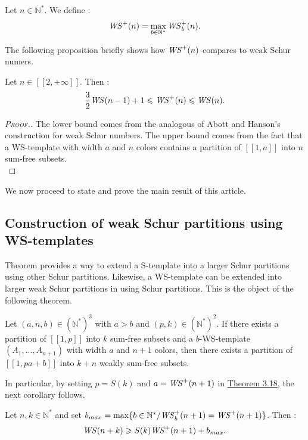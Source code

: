 \begin{definition}
Let \( n \in \mathbb{N}^*\). We define :
\[
\mathit{WS}^+(n)=\max_{b\in \mathbb{N}^*} \mathit{WS}_b^+(n).
\]
\end{definition}
The following proposition briefly shows how \(\mathit{WS}^+(n)\) compares to weak Schur numers.
\begin{proposition}
Let \(n \in [\![2, +\infty]\!]\). Then :
\[
\frac{3}{2} \mathit{WS} (n-1)+1 \leqslant \mathit{WS}^+(n) \leqslant \mathit{WS} (n).
\]
\end{proposition}

\begin{proof}[\textsc{Proof.}]
The lower bound comes from the analogous of Abott and Hanson's construction for weak Schur numbers.
The upper bound comes from the fact that a WS-template with width \(a\) and \(n\) colors contains a partition of
\([\![1, a]\!]\) into \(n\) sum-free subsets. \\
\end{proof}

We now proceed to state and prove the main result of this article.


\subsection{Construction of weak Schur partitions using WS-templates}
\label{ConstructionWS}

Theorem provides a way to extend a S-template into a larger Schur partitions using other Schur partitions. Likewise, a WS-template can 
be extended into larger weak Schur partitions in using Schur partitions. This is the object of the following theorem.

\begin{theorem}
\label{Theorem3.18}
Let \((a,n,b) \in (\mathbb{N}^*)^3\) with \(a > b\) and \( (p,k) \in (\mathbb{N}^*)^2\). If there exists a partition of \([\![1,p]\!]\)
into \(k\) sum-free subsets and a \(b\)-WS-template \((A_1,...,A_{n+1})\) with width \(a\) and \(n+1\) colors,
then there exists a partition of \([\![1, p a + b]\!]\) into \(k+n\) weakly sum-free subsets.
\end{theorem}

In particular, by setting \(p = S(k)\) and \(a = \mathit{WS}^+(n + 1)\) in \hyperref[Theorem3.18]{Theorem 3.18}, the next corollary follows.

\begin{corollary}
\label{Corollary3.19}
Let \(n,k \in \mathbb{N}^*\) and set \( b_{max} = \max \{b\in \mathbb{N}^*/ \mathit{WS}_b^+(n+1) = \mathit{WS}^+(n+1)\}\).
Then :
\[
\mathit{WS}(n+k) \geqslant S(k) \mathit{WS}^+(n+1)+b_{max}.
\]
\end{corollary}

